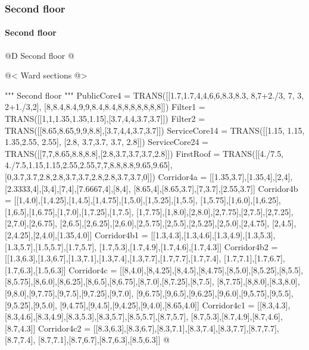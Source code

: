 \documentclass[11pt,oneside]{article}    %
\begin{document}
\subsubsection{Second floor}
\paragraph{Second floor} 
@D Second floor
@{
@< Ward sections @>

""" Second floor """
PublicCore4 = TRANS([[1.7,1.7,4,4,6,6,8.3,8.3, 8,7+2./3, 7, 3, 2+1./3,2],
    [8,8.4,8.4,9,9,8.4,8.4,8,8,8,8,8,8,8]])
Filter1 = TRANS([[1,1,1.35,1.35,1.15],[3.7,4,4,3.7,3.7]])
Filter2 = TRANS([[8.65,8.65,9,9,8.8],[3.7,4,4,3.7,3.7]])
ServiceCore14 = TRANS([[1.15, 1.15, 1.35,2.55, 2.55], [2.8, 3.7,3.7, 3.7, 2.8]])
ServiceCore24 = TRANS([[7,7,8.65,8.8,8.8],[2.8,3.7,3.7,3.7,2.8]])
FirstRoof = TRANS([[4./7.5, 4./7.5,1.15,1.15,2.55,2.55,7,7,8.8,8.8,9.65,9.65],
    [0,3.7,3.7,2.8,2.8,3.7,3.7,2.8,2.8,3.7,3.7,0]])
Corridor4a = [[1.35,3.7],[1.35,4],[2,4],[2.3333,4],[3,4],[7,4],[7.6667,4],[8,4],
    [8.65,4],[8.65,3.7],[7,3.7],[2.55,3.7]]
Corridor4b = [[1,4.0],[1,4.25],[1,4.5],[1,4.75],[1,5.0],[1,5.25],[1,5.5],
    [1,5.75],[1,6.0],[1,6.25],[1,6.5],[1,6.75],[1,7.0],[1,7.25],[1,7.5],
    [1,7.75],[1,8.0],[2,8.0],[2,7.75],[2,7.5],[2,7.25],[2,7.0],[2,6.75],
    [2,6.5],[2,6.25],[2,6.0],[2,5.75],[2,5.5],[2,5.25],[2,5.0],[2,4.75],
    [2,4.5],[2,4.25],[2,4.0],[1.35,4.0]]
Corridor4b1 = [[1.3,4.3],[1.3,4.6],[1.3,4.9],[1.3,5.3],[1.3,5.7],[1.5,5.7],[1.7,5.7],
    [1.7,5.3],[1.7,4.9],[1.7,4.6],[1.7,4.3]]
Corridor4b2 = [[1.3,6.3],[1.3,6.7],[1.3,7.1],[1.3,7.4],[1.3,7.7],[1.7,7.7],[1.7,7.4],
    [1.7,7.1],[1.7,6.7],[1.7,6.3],[1.5,6.3]]
Corridor4c = [[8,4.0],[8,4.25],[8,4.5],[8,4.75],[8,5.0],[8,5.25],[8,5.5],
    [8,5.75],[8,6.0],[8,6.25],[8,6.5],[8,6.75],[8,7.0],[8,7.25],[8,7.5],
    [8,7.75],[8,8.0],[8.3,8.0],[9,8.0],[9,7.75],[9,7.5],[9,7.25],[9,7.0],
    [9,6.75],[9,6.5],[9,6.25],[9,6.0],[9,5.75],[9,5.5],[9,5.25],[9,5.0],
    [9,4.75],[9,4.5],[9,4.25],[9,4.0],[8.65,4.0]]
Corridor4c1 = [[8.3,4.3],[8.3,4.6],[8.3,4.9],[8.3,5.3],[8.3,5.7],[8.5,5.7],[8.7,5.7],
    [8.7,5.3],[8.7,4.9],[8.7,4.6],[8.7,4.3]]
Corridor4c2 = [[8.3,6.3],[8.3,6.7],[8.3,7.1],[8.3,7.4],[8.3,7.7],[8.7,7.7],[8.7,7.4],
    [8.7,7.1],[8.7,6.7],[8.7,6.3],[8.5,6.3]]
@}
\end{document}

